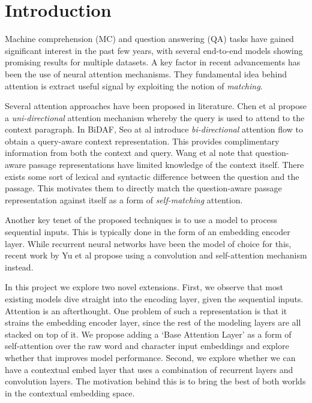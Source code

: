 \section{Introduction}
\label{sec:introduction}

Machine comprehension (MC) and question answering (QA) tasks have gained significant interest in the past few years, with several end-to-end models showing promising results for multiple datasets. A key factor in recent advancements has been the use of neural attention mechanisms. They fundamental idea behind attention is extract useful signal by exploiting the notion of \textit{matching}. 

Several attention approaches have been proposed in literature. Chen et al \cite{chen2016thorough} propose a \textit{uni-directional} attention mechanism whereby the query is used to attend to the context paragraph. In BiDAF, Seo at al \cite{seo2016bidirectional} introduce \textsl{bi-directional} attention flow to obtain a query-aware context representation. This provides complimentary information from both the context and query. Wang et al \cite{wang2017gated} note that question-aware passage representations have limited knowledge of the context itself. There exists some sort of lexical and syntactic difference between the question and the passage. This motivates them to directly match the question-aware passage representation against itself as a form of \textit{self-matching} attention. 

Another key tenet of the proposed techniques is to use a model to process sequential inputs. This is typically done in the form of an embedding encoder layer. While recurrent neural networks have been the model of choice for this, recent work by Yu et al \cite{yu2018qanet} propose using a convolution and self-attention mechanism instead. 

In this project we explore two novel extensions. First, we observe that most existing models dive straight into the encoding layer, given the sequential inputs. Attention is an afterthought. One problem of such a representation is that it strains the embedding encoder layer, since the rest of the modeling layers are all stacked on top of it. We propose adding a `Base Attention Layer' as a form of self-attention over the raw word and character input embeddings and explore whether that improves model performance. Second, we explore whether we can have a contextual embed layer that uses a combination of recurrent layers and convolution layers. The motivation behind this is to bring the best of both worlds in the contextual embedding space.

 






